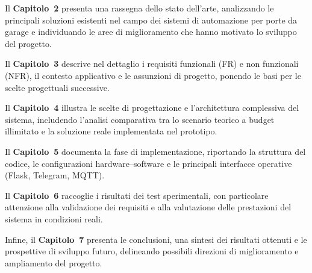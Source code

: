 Il \textbf{Capitolo~2} presenta una rassegna dello stato dell’arte, analizzando le principali soluzioni esistenti nel campo dei sistemi di automazione per porte da garage e individuando le aree di miglioramento che hanno motivato lo sviluppo del progetto.  

Il \textbf{Capitolo~3} descrive nel dettaglio i requisiti funzionali (FR) e non funzionali (NFR), il contesto applicativo e le assunzioni di progetto, ponendo le basi per le scelte progettuali successive.  

Il \textbf{Capitolo~4} illustra le scelte di progettazione e l’architettura complessiva del sistema, includendo l’analisi comparativa tra lo scenario teorico a budget illimitato e la soluzione reale implementata nel prototipo.  

Il \textbf{Capitolo~5} documenta la fase di implementazione, riportando la struttura del codice, le configurazioni hardware–software e le principali interfacce operative (Flask, Telegram, MQTT).  

Il \textbf{Capitolo~6} raccoglie i risultati dei test sperimentali, con particolare attenzione alla validazione dei requisiti e alla valutazione delle prestazioni del sistema in condizioni reali.  

Infine, il \textbf{Capitolo~7} presenta le conclusioni, una sintesi dei risultati ottenuti e le prospettive di sviluppo futuro, delineando possibili direzioni di miglioramento e ampliamento del progetto.
